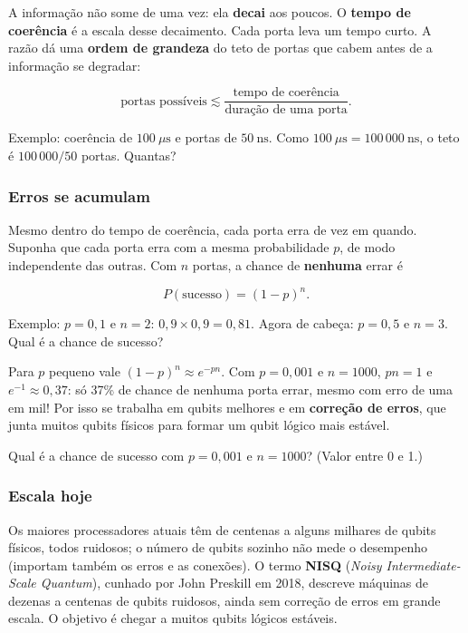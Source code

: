 A informação não some de uma vez: ela \textbf{decai} aos poucos. O \textbf{tempo de coerência} é a escala desse decaimento. Cada porta leva um tempo curto. A razão dá uma \textbf{ordem de grandeza} do teto de portas que cabem antes de a informação se degradar:

\[
\text{portas possíveis} \lesssim \frac{\text{tempo de coerência}}{\text{duração de uma porta}}.
\]

Exemplo: coerência de \(100\ \mu\text{s}\) e portas de \(50\ \text{ns}\). Como \(100\ \mu\text{s} = 100\,000\ \text{ns}\), o teto é \(100\,000/50\) portas. Quantas?

\subsubsection{Erros se acumulam}\label{erros-se-acumulam}

Mesmo dentro do tempo de coerência, cada porta erra de vez em quando. Suponha que cada porta erra com a mesma probabilidade \(p\), de modo independente das outras. Com \(n\) portas, a chance de \textbf{nenhuma} errar é

\[
P(\text{sucesso}) = (1-p)^n.
\]

Exemplo: \(p=0{,}1\) e \(n=2\): \(0{,}9\times 0{,}9 = 0{,}81\). Agora de cabeça: \(p=0{,}5\) e \(n=3\). Qual é a chance de sucesso?

Para \(p\) pequeno vale \((1-p)^n \approx e^{-pn}\). Com \(p=0{,}001\) e \(n=1000\), \(pn=1\) e \(e^{-1}\approx 0{,}37\): só 37\% de chance de nenhuma porta errar, mesmo com erro de uma em mil! Por isso se trabalha em qubits melhores e em \textbf{correção de erros}, que junta muitos qubits físicos para formar um qubit lógico mais estável.

Qual é a chance de sucesso com \(p=0{,}001\) e \(n=1000\)? (Valor entre 0 e 1.)

\subsubsection{Escala hoje}\label{escala-hoje}

Os maiores processadores atuais têm de centenas a alguns milhares de qubits físicos, todos ruidosos; o número de qubits sozinho não mede o desempenho (importam também os erros e as conexões). O termo \textbf{NISQ} (\emph{Noisy Intermediate-Scale Quantum}), cunhado por John Preskill em 2018, descreve máquinas de dezenas a centenas de qubits ruidosos, ainda sem correção de erros em grande escala. O objetivo é chegar a muitos qubits lógicos estáveis.

